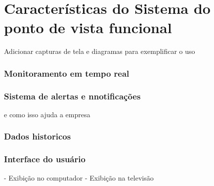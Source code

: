 \chapter{Características do Sistema do ponto de vista funcional}\label{cap:conclusions}
Adicionar capturas de tela e diagramas para exemplificar o uso


\subsection[Monitoramento em tempo real]{Monitoramento em tempo real}


\subsection[Sistema de alertas e nnotificações]{Sistema de alertas e nnotificações}
e como isso ajuda a empresa

\subsection[Dados historicos]{Dados historicos}

\subsection[Interface do usuário]{Interface do usuário}
- Exibição no computador
- Exibição na televisão